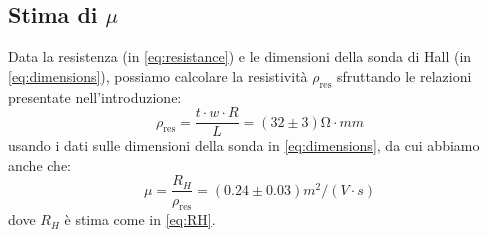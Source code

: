 \subsection{Stima di $ \mu $}

Data la resistenza (in \cref{eq:resistance}) e le dimensioni della sonda di Hall (in \cref{eq:dimensions}), possiamo calcolare la resistività $ \rho_\text{res} $ sfruttando le relazioni presentate nell'introduzione:
\begin{equation}
\rho_\text{res} = \frac{t \cdot w \cdot R}{L} = (32 \pm 3) \unit{\ohm \cdot mm}
\end{equation}
usando i dati sulle dimensioni della sonda in \cref{eq:dimensions}, da cui abbiamo anche che:
\begin{equation} \label{eq:mobility}
\mu = \frac{R_H}{\rho_\text{res}}  = (0.24 \pm 0.03) \unit{m^2 / (V \cdot s)}
\end{equation}
dove $ R_H $ è stima come in \cref{eq:RH}.
